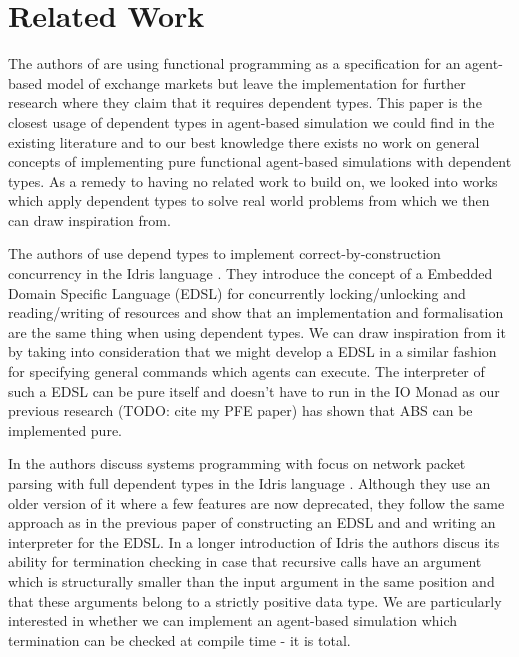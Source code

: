 \section{Related Work}
\label{sec:related_work}
The authors of \cite{botta_functional_2011} are using functional programming as a specification for an agent-based model of exchange markets but leave the implementation for further research where they claim that it requires dependent types. This paper is the closest usage of dependent types in agent-based simulation we could find in the existing literature and to our best knowledge there exists no work on general concepts of implementing pure functional agent-based simulations with dependent types. As a remedy to having no related work to build on, we looked into works which apply dependent types to solve real world problems from which we then can draw inspiration from. 

The authors of \cite{brady_correct-by-construction_2010} use depend types to implement correct-by-construction concurrency in the Idris language \cite{brady_idris_2013}. They introduce the concept of a Embedded Domain Specific Language (EDSL) for concurrently locking/unlocking and reading/writing of resources and show that an implementation and formalisation are the same thing when using dependent types. We can draw inspiration from it by taking into consideration that we might develop a EDSL in a similar fashion for specifying general commands which agents can execute. The interpreter of such a EDSL can be pure itself and doesn't have to run in the IO Monad as our previous research (TODO: cite my PFE paper) has shown that ABS can be implemented pure.

In \cite{brady_idris_2011} the authors discuss systems programming with focus on network packet parsing with full dependent types in the Idris language \cite{brady_idris_2013}. Although they use an older version of it where a few features are now deprecated, they follow the same approach as in the previous paper of constructing an EDSL and and writing an interpreter for the EDSL. In a longer introduction of Idris the authors discus its ability for termination checking in case that recursive calls have an argument which is structurally smaller than the input argument in the same position and that these arguments belong to a strictly positive data type. We are particularly interested in whether we can implement an agent-based simulation which termination can be checked at compile time - it is total.

